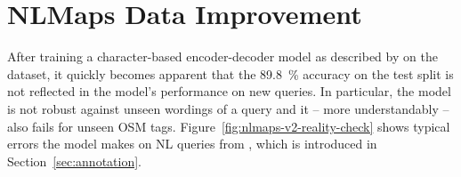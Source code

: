 \chapter{NLMaps Data Improvement}
\label{ch:nlmaps-improvement}

After training a character-based encoder-decoder model as described by
\textcite{staniek-2020} on the \nlmapstwo{} dataset, it quickly becomes apparent
that the \SI{89.8}{\%} accuracy on the test split is not reflected in the
model’s performance on new queries. In particular, the model is not robust
against unseen wordings of a query and it – more understandably – also fails for
unseen OSM tags. Figure~\ref{fig:nlmaps-v2-reality-check} shows typical errors
the model makes on NL queries from \nlmapsfour{}, which is introduced in
Section~\ref{sec:annotation}.

